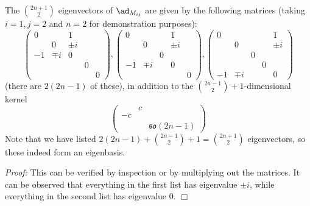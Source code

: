 \documentclass[11pt, headheight=30pt]{scrartcl}
\begin{document}
\begin{claim*}[Diagonalizing $\ad_{M_{ij}}$]
    The $\binom{2n+1}{2}$ eigenvectors of $\ad_{M_{ij}}$ are given by the following matrices (taking $i=1,j=2$ and $n=2$ for demonstration purposes):
    \[
        \begin{pmatrix}
            0&&1&&\\
            &0&\pm i&&\\
            -1&\mp i&0&&\\
            &&&0&\\
            &&&& 0
        \end{pmatrix},
        \begin{pmatrix}
            0&&&1&\\
            &0&&\pm i&\\
            &&0&& \\
            -1&\mp i&&0&\\
            &&&& 0
        \end{pmatrix},
        \begin{pmatrix}
            0&&&&1\\
            &0&&&\pm i\\
            &&0&& \\
            &&&0&\\
            -1&\mp i&&&0
        \end{pmatrix}
    \]
    (there are $2(2n-1)$ of these), in addition to the $\binom{2n-1}{2}+1$-dimensional
    kernel
    \[
    \begin{pmatrix}
        &c& \\
        -c & & \\
        & & \mathfrak{so}(2n-1)
    \end{pmatrix}
    \]
    Note that we have listed $2(2n-1)+\binom{2n-1}{2}+1 = \binom{2n+1}{2}$ eigenvectors, so these indeed form an eigenbasis.
\end{claim*}
\textit{Proof: } This can be verified by inspection or by multiplying out the matrices. It can be observed that everything in the first list has eigenvalue $\pm i$, while everything in the second list has eigenvalue $0$. $\Box$
\end{document}
